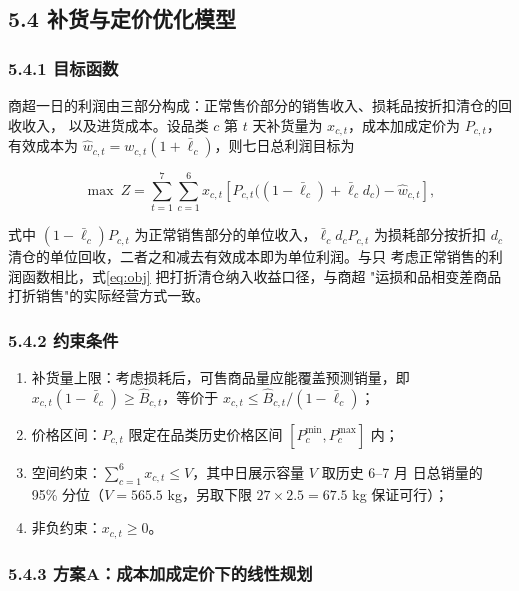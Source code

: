 \subsection{5.4 补货与定价优化模型}

\subsubsection{5.4.1 目标函数}

商超一日的利润由三部分构成：正常售价部分的销售收入、损耗品按折扣清仓的回收收入，
以及进货成本。设品类 $c$ 第 $t$ 天补货量为 $x_{c,t}$，成本加成定价为 $P_{c,t}$，
有效成本为 $\hat w_{c,t}=w_{c,t}(1+\bar\ell_c)$，则七日总利润目标为

\begin{equation}
\max\ Z=\sum_{t=1}^{7}\sum_{c=1}^{6}x_{c,t}\left[P_{c,t}\bigl((1-\bar\ell_c)+\bar\ell_c d_c\bigr)-\hat w_{c,t}\right],
\label{eq:obj}
\end{equation}

式中 $(1-\bar\ell_c)P_{c,t}$ 为正常销售部分的单位收入，$\bar\ell_c d_c P_{c,t}$
为损耗部分按折扣 $d_c$ 清仓的单位回收，二者之和减去有效成本即为单位利润。与只
考虑正常销售的利润函数相比，式\eqref{eq:obj} 把打折清仓纳入收益口径，与商超
"运损和品相变差商品打折销售"的实际经营方式一致。

\subsubsection{5.4.2 约束条件}

\begin{enumerate}[label=（\arabic*）]
\item 补货量上限：考虑损耗后，可售商品量应能覆盖预测销量，即
      $x_{c,t}(1-\bar\ell_c)\ge\hat B_{c,t}$，等价于
      $x_{c,t}\le\hat B_{c,t}/(1-\bar\ell_c)$；
\item 价格区间：$P_{c,t}$ 限定在品类历史价格区间 $[P_c^{\min},P_c^{\max}]$ 内；
\item 空间约束：$\sum_{c=1}^{6}x_{c,t}\le V$，其中日展示容量 $V$ 取历史 6--7 月
      日总销量的 95\% 分位（$V=565.5$ kg，另取下限 $27\times2.5=67.5$ kg 保证可行）；
\item 非负约束：$x_{c,t}\ge0$。
\end{enumerate}

\subsubsection{5.4.3 方案A：成本加成定价下的线性规划}

